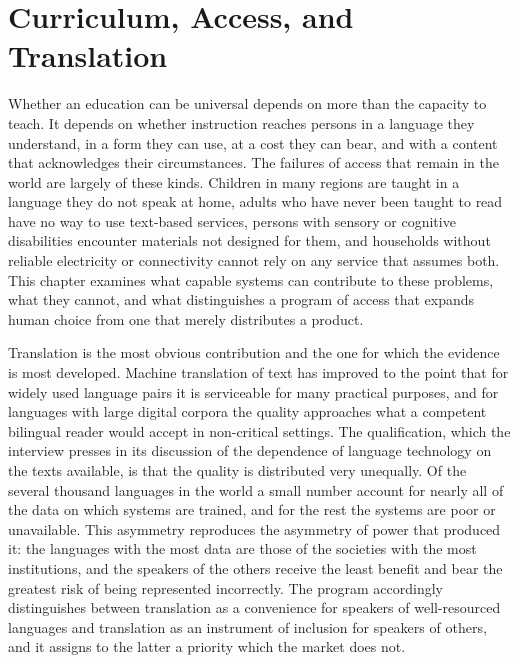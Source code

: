 \chapter{Curriculum, Access, and Translation}
\label{ch:12}

Whether an education can be universal depends on more than the capacity to teach. It depends on whether instruction reaches persons in a language they understand, in a form they can use, at a cost they can bear, and with a content that acknowledges their circumstances. The failures of access that remain in the world are largely of these kinds. Children in many regions are taught in a language they do not speak at home, adults who have never been taught to read have no way to use text-based services, persons with sensory or cognitive disabilities encounter materials not designed for them, and households without reliable electricity or connectivity cannot rely on any service that assumes both. This chapter examines what capable systems can contribute to these problems, what they cannot, and what distinguishes a program of access that expands human choice from one that merely distributes a product.

Translation is the most obvious contribution and the one for which the evidence is most developed. Machine translation of text has improved to the point that for widely used language pairs it is serviceable for many practical purposes, and for languages with large digital corpora the quality approaches what a competent bilingual reader would accept in non-critical settings. The qualification, which the interview presses in its discussion of the dependence of language technology on the texts available, is that the quality is distributed very unequally. Of the several thousand languages in the world a small number account for nearly all of the data on which systems are trained, and for the rest the systems are poor or unavailable. This asymmetry reproduces the asymmetry of power that produced it: the languages with the most data are those of the societies with the most institutions, and the speakers of the others receive the least benefit and bear the greatest risk of being represented incorrectly. The program accordingly distinguishes between translation as a convenience for speakers of well-resourced languages and translation as an instrument of inclusion for speakers of others, and it assigns to the latter a priority which the market does not.

